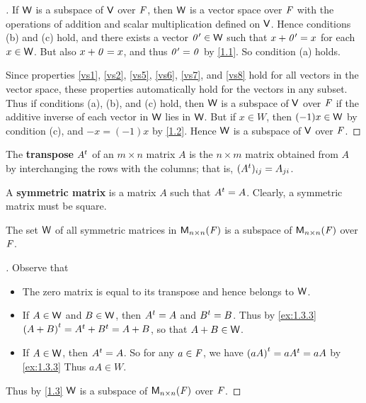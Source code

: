 \begin{proof}[]
  If \(\mathsf{W}\) is a subspace of \(\mathsf{V}\) over \(\mathit{F}\), then \(\mathsf{W}\) is a vector space over \(\mathit{F}\) with the operations of addition and scalar multiplication defined on \(\mathsf{V}\).
  Hence conditions (b) and (c) hold, and there exists a vector \(\mathit{0}' \in \mathsf{W}\) such that \(x + \mathit{0}' = x\) for each \(x \in \mathsf{W}\).
  But also \(x + \mathit{0} = x\), and thus \(\mathit{0}' = \mathit{0}\) by \cref{1.1}.
  So condition (a) holds.

  Since properties \ref{vs1}, \ref{vs2}, \ref{vs5}, \ref{vs6}, \ref{vs7}, and \ref{vs8} hold for all vectors in the vector space, these properties automatically hold for the vectors in any subset.
  Thus if conditions (a), (b), and (c) hold, then \(\mathsf{W}\) is a subspace of \(\mathsf{V}\) over \(\mathit{F}\) if the additive inverse of each vector in \(\mathsf{W}\) lies in \(\mathsf{W}\).
  But if \(x \in W\), then \((-1) x \in \mathsf{W}\) by condition (c), and \(-x = (-1) x\) by \cref{1.2}.
  Hence \(\mathsf{W}\) is a subspace of \(\mathsf{V}\) over \(\mathit{F}\).
\end{proof}

\begin{defn}\label{1.3.3}
  The \textbf{transpose} \({A}^{t}\) of an \(m \times n\) matrix \(A\) is the \(n \times m\) matrix obtained from \(A\) by interchanging the rows with the columns;
  that is, \(({A}^{t})_{i j} = A_{j i}\).
\end{defn}

\begin{defn}\label{1.3.4}
  A \textbf{symmetric matrix} is a matrix \(A\) such that \({A}^{t} = A\).
  Clearly, a symmetric matrix must be square.
\end{defn}

\begin{eg}\label{1.3.5}
  The set \(\mathsf{W}\) of all symmetric matrices in \(\ms[n][n][\F]\) is a subspace of \(\ms[n][n][\F]\) over \(\mathit{F}\).
\end{eg}

\begin{proof}[]
  Observe that
  \begin{itemize}
    \item The zero matrix is equal to its transpose and hence belongs to \(\mathsf{W}\).
    \item If \(A \in \mathsf{W}\) and \(B \in \mathsf{W}\), then \({A}^{t} = A\) and \({B}^{t} = B\).
          Thus by \cref{ex:1.3.3} \({(A + B)}^{t} = {A}^{t} + {B}^{t} = A + B\), so that \(A + B \in \mathsf{W}\).
    \item If \(A \in \mathsf{W}\), then \({A}^{t} = A\).
          So for any \(a \in \mathit{F}\), we have \({(aA)}^{t} = a{A}^{t} = aA\) by \cref{ex:1.3.3}
          Thus \(aA \in W\).
  \end{itemize}
  Thus by \cref{1.3} \(\mathsf{W}\) is a subspace of \(\ms[n][n][\F]\) over \(\mathit{F}\).
\end{proof}


